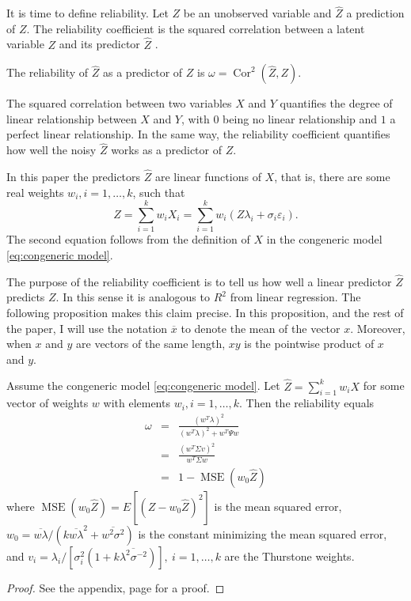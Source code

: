 \documentclass[twoside]{article}
\DeclareMathOperator{\Cor}{Cor}
\DeclareMathOperator{\MSE}{MSE}
\begin{document}
It is time to define reliability. Let $Z$ be an unobserved variable and $\hat{Z}$ a prediction of $Z$. The reliability coefficient is the squared correlation between a latent variable $Z$ and its predictor $\hat{Z}$ \citep[][p. 61]{Lord1968-ax}. 

\begin{defn}\label{defn:reliability} The reliability of $\hat{Z}$ as a predictor of $Z$ is $\omega=\Cor^{2}(\hat{Z},Z)$.
\end{defn} 

The squared correlation between two variables $X$ and $Y$ quantifies the degree of linear relationship between $X$ and $Y$, with $0$ being no linear relationship and $1$ a perfect linear relationship. In the same way, the reliability coefficient quantifies how well the noisy $\hat{Z}$ works as a predictor of $Z$.

In this paper the predictors $\hat{Z}$ are linear functions of $X$, that is, there are some real weights $w_{i},i=1,\ldots,k$, such that
\begin{equation}
\label{eq:Linear predictor}
\hat{Z} =  \sum_{i=1}^{k} w_{i}X_i = \sum_{i=1}^{k}w_{i}(Z\lambda_i + \sigma_{i} \varepsilon_i).\nonumber 
\end{equation}
The second equation follows from the definition of $X$ in the congeneric model \eqref{eq:congeneric model}. 


The purpose of the reliability coefficient is to tell us how well a linear predictor $\hat{Z}$ predicts $Z$. In this sense it is analogous to $R^2$ from linear regression. The following proposition makes this claim precise. In this proposition, and the rest of the paper, I will use the notation $\overline{x}$ to denote the mean of the vector $x$. Moreover, when $x$ and $y$ are vectors of the same length, $xy$ is the pointwise product of $x$ and $y$.

\begin{prop}
\label{prop:reliability motivation}Assume the congeneric model \eqref{eq:congeneric model}. Let $\hat{Z}=\sum_{i=1}^{k}w_{i}X$
for some vector of weights $w$ with elements $w_{i},i=1,\ldots,k$. Then the reliability equals
\begin{eqnarray}
\omega & = & \frac{(w^{T}\lambda)^{2}}{(w^{T}\lambda)^{2}+w^{T}\Psi w}\label{eq:linear reliabiltiy}\\
 & = & \frac{(w^{T}\Sigma v)^{2}}{w^{T}\Sigma w} \nonumber \\
 & = & 1- \MSE (w_{0}\hat{Z})\nonumber 
\end{eqnarray}
where $\MSE (w_{0}\hat{Z})=E[(Z-w_{0}\hat{Z})^{2}]$ is the
mean squared error, $w_{0}=\overline{w\lambda}/(k\overline{w\lambda}^{2}+\overline{w^{2}\sigma^{2}})$ is the constant minimizing the mean squared error, and  $v_{i}=\lambda_{i}/[\sigma_{i}^{2}(1+k\overline{\lambda^{2}\sigma^{-2}})],\:i=1,\ldots,k$ are the Thurstone weights.
\end{prop}
\begin{proof}
See the appendix, page \pageref{proof:reliability motivation} for a proof.
\end{proof}
\end{document}
